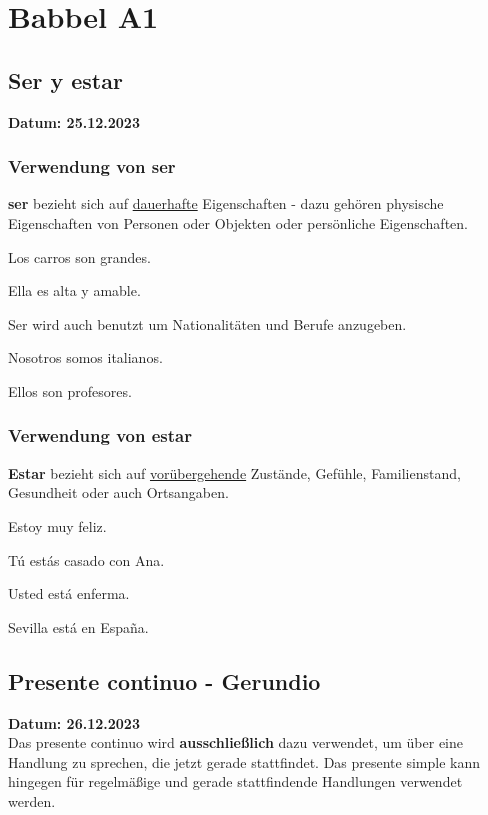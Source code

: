\chapter{Babbel A1}
\section{Ser y estar}
\textbf{Datum: 25.12.2023}
\subsection*{Verwendung von ser}
\textbf{ser} bezieht sich auf \underline{dauerhafte} Eigenschaften - dazu 
gehören physische Eigenschaften von Personen oder Objekten oder
persönliche Eigenschaften.

\begin{ejemplos}
    \item Los carros son grandes.
    \item Ella es alta y amable.
\end{ejemplos}

Ser wird auch benutzt um Nationalitäten und Berufe anzugeben.

\begin{ejemplos}
    \item Nosotros somos italianos.
    \item Ellos son profesores.
\end{ejemplos}

\subsection*{Verwendung von estar}
\textbf{Estar} bezieht sich auf \underline{vorübergehende} Zustände,
Gefühle, Familienstand, Gesundheit oder auch Ortsangaben.

\begin{ejemplos}
    \item Estoy muy feliz.
    \item Tú estás casado con Ana.
    \item Usted está enferma.
    \item Sevilla está en España.
\end{ejemplos}

\section{Presente continuo - Gerundio}
\textbf{Datum: 26.12.2023}\\
Das presente continuo wird \textbf{ausschließlich}
dazu verwendet, um über eine Handlung zu sprechen,
die jetzt gerade stattfindet. Das presente simple
kann hingegen für regelmäßige und gerade stattfindende
Handlungen verwendet werden.

